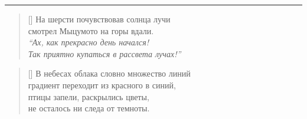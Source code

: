 \documentclass[14pt]{memoir}
\begin{document}
\clearpage
{}
\BgThispage

\fancybreak{* * *}

\begin{verse}[\versewidth]
На шерсти почувствовав солнца лучи \\
смотрел Мыцумото на горы вдали. \\
\emph{``Ах, как прекрасно день начался! \\
Так приятно купаться в рассвета лучах!''}
\end{verse}

\begin{verse}[\versewidth]
В небесах облака словно множество линий \\
градиент переходит из красного в синий, \\
птицы запели, раскрылись цветы, \\
не осталось ни следа от темноты. 
\end{verse}
\end{document}
